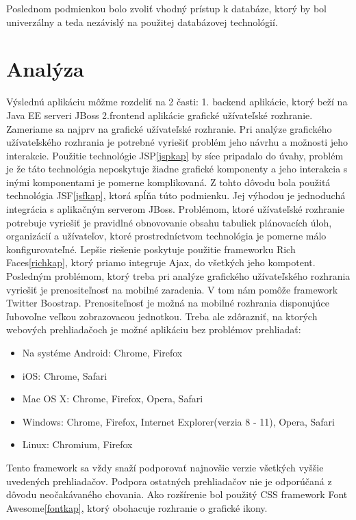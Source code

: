 Poslednom podmienkou bolo zvoliť vhodný prístup k databáze, ktorý by bol univerzálny a teda nezávislý na použitej databázovej technológií.

\section{Analýza}
Výslednú aplikáciu môžme rozdeliť na 2 časti: 1. backend aplikácie, ktorý beží na Java EE serveri JBoss 2.frontend aplikácie grafické užívateľské rozhranie. Zameriame sa najprv na grafické užívateľské rozhranie. Pri analýze grafického užívateľského rozhrania je potrebné vyriešiť problém jeho návrhu a možnosti jeho interakcie. Použitie technológie JSP\ref{jspkap} by síce pripadalo do úvahy, problém je že táto technológia neposkytuje žiadne grafické komponenty a jeho interakcia s inými komponentami je pomerne komplikovaná. Z tohto dôvodu bola použitá technológia JSF\ref{jsfkap}, ktorá spĺňa túto podmienku. Jej výhodou je jednoduchá integrácia s aplikačným serverom JBoss. Problémom, ktoré užívateľské rozhranie potrebuje vyriešiť je pravidlné obnovovanie obsahu tabuliek plánovacích úloh, organizácií a užívateľov, ktoré prostredníctvom technológia je pomerne málo konfigurovateľné. Lepšie riešenie poskytuje použitie frameworku Rich Faces\ref{richkap}, ktorý priamo integruje Ajax\cite{ajaxbook}, do všetkých jeho kompotent. Posledným problémom, ktorý treba pri analýze grafického užívateľského rozhrania vyriešiť je prenositeľnosť na mobilné zaradenia. V tom nám pomôže framework Twitter Boostrap\label{bootkap}. Prenositeľnosť je možná na mobilné rozhrania disponujúce ľubovoľne veľkou zobrazovacou jednotkou. Treba ale zdôrazniť, na ktorých webových prehliadačoch je možné aplikáciu bez problémov prehliadať:
\begin{itemize}
\item Na systéme Android: Chrome, Firefox
\item iOS: Chrome, Safari
\item Mac OS X: Chrome, Firefox, Opera, Safari
\item Windows: Chrome, Firefox, Internet Explorer(verzia 8 - 11), Opera, Safari
\item Linux: Chromium, Firefox
\end{itemize}
Tento framework sa vždy snaží podporovať najnovšie verzie všetkých vyššie uvedených prehliadačov. Podpora ostatných prehliadačov nie je odporúčaná z dôvodu neočakávaného chovania. Ako rozšírenie bol použitý CSS framework Font Awesome\ref{fontkap}, ktorý obohacuje rozhranie o grafické ikony.

